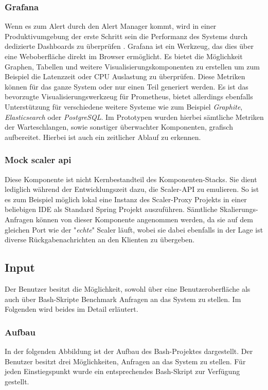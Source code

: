 \subsubsection{Grafana}
Wenn es zum Alert durch den Alert Manager kommt, wird in einer Produktivumgebung der erste Schritt sein die Performanz des Systems durch dedizierte Dashboards zu überprüfen \cite[Seite~97]{oreillyPrometheus}. Grafana ist ein Werkzeug, das dies über eine Weboberfläche direkt im Browser ermöglicht. Es bietet die Möglichkeit Graphen, Tabellen und weitere Visualisierungskomponenten zu erstellen um zum Beispiel die Latenzzeit oder CPU Auslastung zu überprüfen. Diese Metriken können für das ganze System oder nur einen Teil generiert werden. Es ist das bevorzugte Visualisierungswerkzeug für Prometheus, bietet allerdings ebenfalls Unterstützung für verschiedene weitere Systeme wie zum Beispiel \emph{Graphite}, \emph{Elasticsearch} oder \emph{PostgreSQL}. Im Prototypen wurden hierbei sämtliche Metriken der Warteschlangen, sowie sonstiger überwachter Komponenten, grafisch aufbereitet. Hierbei ist auch ein zeitlicher Ablauf zu erkennen.


\subsubsection{Mock scaler api}
Diese Komponente ist nicht Kernbestandteil des Komponenten-Stacks. Sie dient lediglich während der Entwicklungszeit dazu, die Scaler-API zu emulieren. So ist es zum Beispiel möglich lokal eine Instanz des Scaler-Proxy Projekts in einer beliebigen IDE als Standard Spring Projekt auszuführen. Sämtliche Skalierungs-Anfragen können von dieser Komponente angenommen werden, da sie auf dem gleichen Port wie der "\emph{echte}" Scaler läuft, wobei sie dabei ebenfalls in der Lage ist diverse Rückgabenachrichten an den Klienten zu übergeben.


\subsection{Input}
\label{ss:Input}

Der Benutzer besitzt die Möglichkeit, sowohl über eine Benutzeroberfläche als auch über Bash-Skripte Benchmark Anfragen an das System zu stellen. Im Folgenden wird beides im Detail erläutert.

\label{ss:bash}
\subsubsection{Aufbau}
In der folgenden Abbildung ist der Aufbau des Bash-Projektes dargestellt. Der Benutzer besitzt drei Möglichkeiten, Anfragen an das System zu stellen. Für jeden Einstiegspunkt wurde ein entsprechendes Bash-Skript zur Verfügung gestellt.

